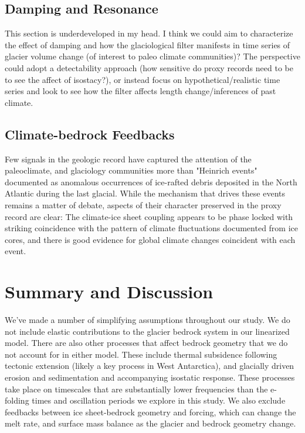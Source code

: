 \documentclass[tc, manuscript]{copernicus}
\begin{document}
\subsection{Damping and Resonance}

This section is underdeveloped in my head. I think we could aim to characterize the effect of damping and how the glaciological filter manifests in time series of glacier volume change (of interest to paleo climate communities)? The perspective could adopt a detectability approach (how sensitive do proxy records need to be to see the affect of isostacy?), or instead focus on hypothetical/realistic time series and look to see how the filter affects length change/inferences of past climate.

\subsection{Climate-bedrock Feedbacks}

Few signals in the geologic record have captured the attention of the paleoclimate, and glaciology communities more than "Heinrich events" documented as anomalous occurrences of ice-rafted debris deposited in the North Atlantic during the last glacial.
While the mechanism that drives these events remains a matter of debate, aspects of their character preserved in the proxy record are clear:
The climate-ice sheet coupling appears to be phase locked with striking coincidence with the pattern of climate fluctuations documented from ice cores, and there is good evidence for global climate changes coincident with each event.


\section{Summary and Discussion}

We've made a number of simplifying assumptions throughout our study. 
We do not include elastic contributions to the glacier bedrock system in our linearized model.
There are also other processes that affect bedrock geometry that we do not account for in either model.
These include thermal subsidence following tectonic extension (likely a key process in West Antarctica), and glacially driven erosion and sedimentation and accompanying isostatic response.
These processes take place on timescales that are substantially lower frequencies than the e-folding times and oscillation periods we explore in this study.
We also exclude feedbacks between ice sheet-bedrock geometry and forcing, which can change the melt rate, and surface mass balance as the glacier and bedrock geometry change.
\end{document}
